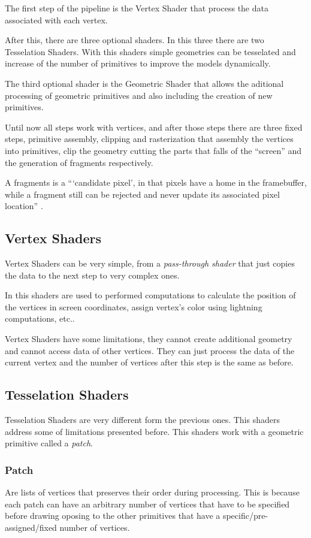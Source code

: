 The first step of the pipeline is the Vertex Shader that process the data associated with each vertex. 

After this, there are three optional shaders. In this three there are two Tesselation Shaders. With this shaders simple geometries can be tesselated and increase of the number of primitives to improve the models dynamically.

The third optional shader is the Geometric Shader that allows the aditional processing of geometric primitives and also including the creation of new primitives.

Until now all steps work with vertices, and after those steps there are three fixed steps, primitive assembly, clipping and rasterization that assembly the vertices into primitives, clip the geometry cutting the parts that falls of the ``screen'' and the generation of fragments respectively.

A fragments is a ``‘candidate pixel’, in that pixels have a home in the framebuffer, while a fragment still can be rejected and never update its associated pixel location'' \cite{shreiner2013opengl}.
\subsection{Vertex Shaders} %
\label{sub:vertex_shaders}
Vertex Shaders can be very simple, from a \emph{pass-through shader} that just copies the data to the next step to very complex ones.

In this shaders are used to performed computations to calculate the position of the vertices in screen coordinates, assign vertex's color using lightning computations, etc..

Vertex Shaders have some limitations, they cannot create additional geometry and cannot access data of other vertices. They can just process the data of the current vertex and the number of vertices after this step is the same as before.


\subsection{Tesselation Shaders} %
\label{sub:tesselation_shaders}
Tesselation Shaders are very different form the previous ones. This shaders address some of limitations presented before.
This shaders work with a geometric primitive called a \emph{patch}.

\subsubsection{Patch} %
\label{ssub:patch}
	Are lists of vertices that preserves their order during processing. This is because each patch can have an arbitrary number of vertices that have to be specified before drawing oposing to the other primitives that have a specific/pre-assigned/fixed number of vertices.

